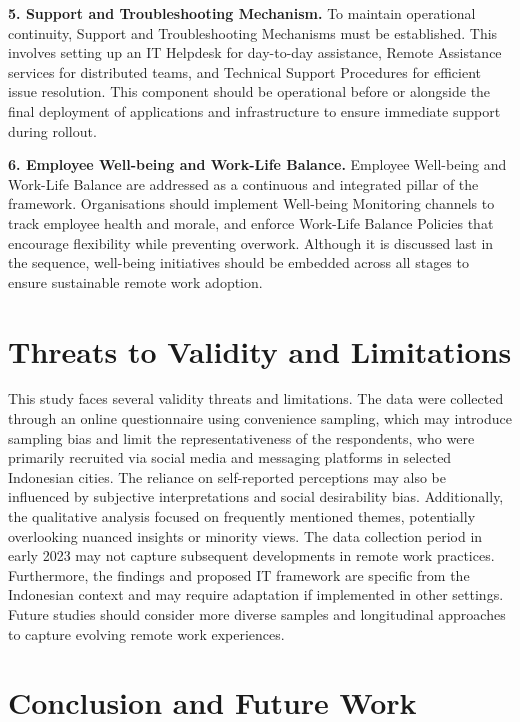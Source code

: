 \documentclass{infotel}
\begin{document}
\textbf{5. Support and Troubleshooting Mechanism.}  
To maintain operational continuity, Support and Troubleshooting Mechanisms must be established. This involves setting up an IT Helpdesk for day-to-day assistance, Remote Assistance services for distributed teams, and Technical Support Procedures for efficient issue resolution. This component should be operational before or alongside the final deployment of applications and infrastructure to ensure immediate support during rollout.

\textbf{6. Employee Well-being and Work-Life Balance.}  
Employee Well-being and Work-Life Balance are addressed as a continuous and integrated pillar of the framework. Organisations should implement Well-being Monitoring channels to track employee health and morale, and enforce Work-Life Balance Policies that encourage flexibility while preventing overwork. Although it is discussed last in the sequence, well-being initiatives should be embedded across all stages to ensure sustainable remote work adoption.




\section{Threats to Validity and Limitations}

This study faces several validity threats and limitations. The data were collected through an online questionnaire using convenience sampling, which may introduce sampling bias and limit the representativeness of the respondents, who were primarily recruited via social media and messaging platforms in selected Indonesian cities. The reliance on self-reported perceptions may also be influenced by subjective interpretations and social desirability bias. Additionally, the qualitative analysis focused on frequently mentioned themes, potentially overlooking nuanced insights or minority views. The data collection period in early 2023 may not capture subsequent developments in remote work practices. Furthermore, the findings and proposed IT framework are specific from the Indonesian context and may require adaptation if implemented in other settings. Future studies should consider more diverse samples and longitudinal approaches to capture evolving remote work experiences.

\section{Conclusion and Future Work}
\end{document}
